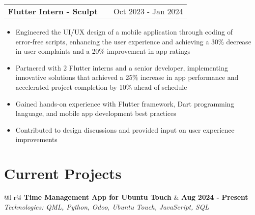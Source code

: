 \documentclass[a4paper,12pt]{article}
\makeatletter
\newenvironment{joblong}[2]
    {
    \begin{tabularx}{\linewidth}{@{}l X r@{}}
    \textbf{#1} & \hfill &  #2 \\[3.75pt]
    \end{tabularx}
    \begin{minipage}[t]{\linewidth}
    \begin{itemize}[nosep,after=\strut, leftmargin=1em, itemsep=3pt,label=--]
    }
    {
    \end{itemize}
    \end{minipage}    
    }
\makeatother
\begin{document}
\begin{joblong}{Flutter Intern - Sculpt}{Oct 2023 - Jan 2024}
\item Engineered the UI/UX design of a mobile application through coding of error-free scripts, enhancing the user experience and achieving a 30\% decrease in user complaints and a 20\% improvement in app ratings
\item Partnered with 2 Flutter interns and a senior developer, implementing innovative solutions that achieved a 25\% increase in app performance and accelerated project completion by 10\% ahead of schedule
\item Gained hands-on experience with Flutter framework, Dart programming language, and mobile app development best practices
\item Contributed to design discussions and provided input on user experience improvements
\end{joblong}


\section{Current Projects}

\begin{tabularx}{\linewidth}{ @{}l r@{} }
\textbf{Time Management App for Ubuntu Touch} & \hfill \textbf{Aug 2024 - Present} \\[3.75pt]
\textit{Technologies: QML, Python, Odoo, Ubuntu Touch, JavaScript, SQL}\\[3.75pt]
  \\
\end{tabularx}
\end{document}
